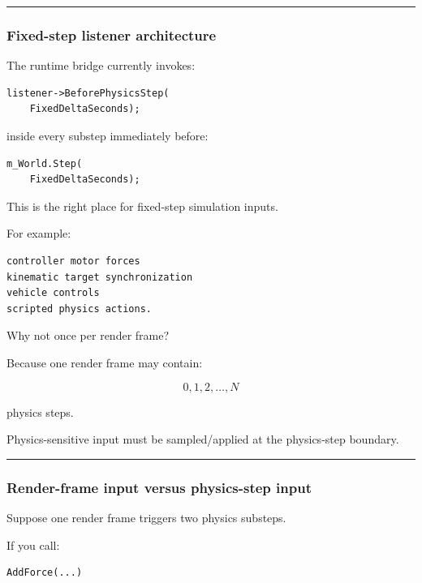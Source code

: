 \begin{center}\rule{0.5\linewidth}{0.5pt}\end{center}

\subsubsection{Fixed-step listener architecture}\label{fixed-step-listener-architecture}

The runtime bridge currently invokes:

\begin{verbatim}
listener->BeforePhysicsStep(
    FixedDeltaSeconds);
\end{verbatim}

inside every substep immediately before:

\begin{verbatim}
m_World.Step(
    FixedDeltaSeconds);
\end{verbatim}

This is the right place for fixed-step simulation inputs.

For example:

\begin{verbatim}
controller motor forces
kinematic target synchronization
vehicle controls
scripted physics actions.
\end{verbatim}

Why not once per render frame?

Because one render frame may contain:

\[
0,1,2,\dots,N
\]

physics steps.

Physics-sensitive input must be sampled/applied at the physics-step boundary.

\begin{center}\rule{0.5\linewidth}{0.5pt}\end{center}

\subsubsection{Render-frame input versus physics-step input}\label{render-frame-input-versus-physics-step-input}

Suppose one render frame triggers two physics substeps.

If you call:

\begin{verbatim}
AddForce(...)
\end{verbatim}

